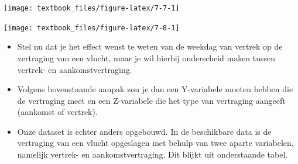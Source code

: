 \documentclass[]{tufte-book}
\newenvironment{Shaded}{}{}
\newcommand{\DataTypeTok}[1]{\textcolor[rgb]{0.56,0.13,0.00}{#1}}
\newcommand{\DecValTok}[1]{\textcolor[rgb]{0.25,0.63,0.44}{#1}}
\newcommand{\KeywordTok}[1]{\textcolor[rgb]{0.00,0.44,0.13}{\textbf{#1}}}
\newcommand{\NormalTok}[1]{#1}
\newcommand{\OperatorTok}[1]{\textcolor[rgb]{0.40,0.40,0.40}{#1}}
\newcommand{\StringTok}[1]{\textcolor[rgb]{0.25,0.44,0.63}{#1}}
\providecommand{\tightlist}{%
  \setlength{\itemsep}{0pt}\setlength{\parskip}{0pt}}
\begin{document}
\texttt{[image: textbook\_files/figure-latex/7-7-1]}

\begin{Shaded}
\end{Shaded}

\texttt{[image: textbook\_files/figure-latex/7-8-1]}

\begin{itemize}
\tightlist
\item
  Stel nu dat je het effect wenst te weten van de weekdag van vertrek op de vertraging van een vlucht, maar je wil hierbij onderscheid maken tussen vertrek- en aankomstvertraging.
\item
  Volgens bovenstaande aanpak zou je dan een Y-variabele moeten hebben die de vertraging meet en een Z-variabele die het type van vertraging aangeeft (aankomst of vertrek).
\item
  Onze dataset is echter anders opgebouwd. In de beschikbare data is de vertraging van een vlucht opgeslagen met behulp van twee aparte variabelen, namelijk vertrek- en aankomstvertraging. Dit blijkt uit onderstaande tabel.
\end{itemize}

\begin{Shaded}
\end{Shaded}
\end{document}
